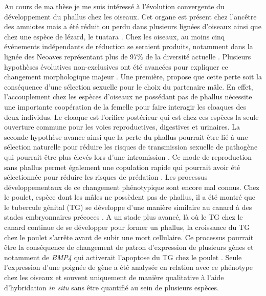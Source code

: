 Au cours de ma thèse je me suis intéressé à l’évolution convergente du développement du phallus chez les oiseaux. Cet organe est présent chez l’ancêtre des amniotes mais a été réduit ou perdu dans plusieurs lignées d’oiseaux ainsi que chez une espèce de lézard, le tuatara \citep{brennan_independent_2008, sanger_resurrecting_2015}. Chez les oiseaux, au moins cinq événements indépendants de réduction se seraient produits, notamment dans la lignée des Neoaves représentant plus de 97\% de la diversité actuelle \citep{brennan_independent_2008}. Plusieurs hypothèses évolutives non-exclusives ont été avancées pour expliquer ce changement morphologique majeur \citep{briskie_sexual_1997}. Une première, propose que cette perte soit la conséquence d’une sélection sexuelle pour le choix du partenaire mâle. En effet, l’accouplement chez les espèces d’oiseaux ne possédant pas de phallus nécessite une importante coopération de la femelle pour faire interagir les cloaques des deux individus. Le cloaque est l’orifice postérieur qui est chez ces espèces la seule ouverture commune pour les voies reproductives, digestives et urinaires. La seconde hypothèse avance ainsi que la perte du phallus pourrait être lié à une sélection naturelle pour réduire les risques de transmission sexuelle de pathogène qui pourrait être plus élevés lors d’une intromission \citep{briskie_sexual_1997}. Ce mode de reproduction sans phallus permet également une copulation rapide qui pourrait avoir été sélectionnée pour réduire les risques de prédation \citep{wesotowski_reduction_1999}. Les processus développementaux de ce changement phénotypique sont encore mal connus. Chez le poulet, espèce dont les mâles ne possèdent pas de phallus, il a été montré que le tubercule génital (\acrshort{TG}) se développe d’une manière similaire au canard à des stades embryonnaires précoces \citep{herrera_developmental_2013}. A un stade plus avancé, là où le \acrshort{TG} chez le canard continue de se développer pour former un phallus, la croissance du \acrshort{TG} chez le poulet s’arrête avant de subir une mort cellulaire. Ce processus pourrait être la conséquence de changement de patron d’expression de plusieurs gènes et notamment de \textit{BMP4} qui activerait l’apoptose du \acrshort{TG} chez le poulet \citep{herrera_developmental_2013}. Seule l’expression d’une poignée de gène a été analysée en relation avec ce phénotype chez les oiseaux et souvent uniquement de manière qualitative à l’aide d’hybridation \textit{in situ} sans être quantifié au sein de plusieurs espèces. \\


